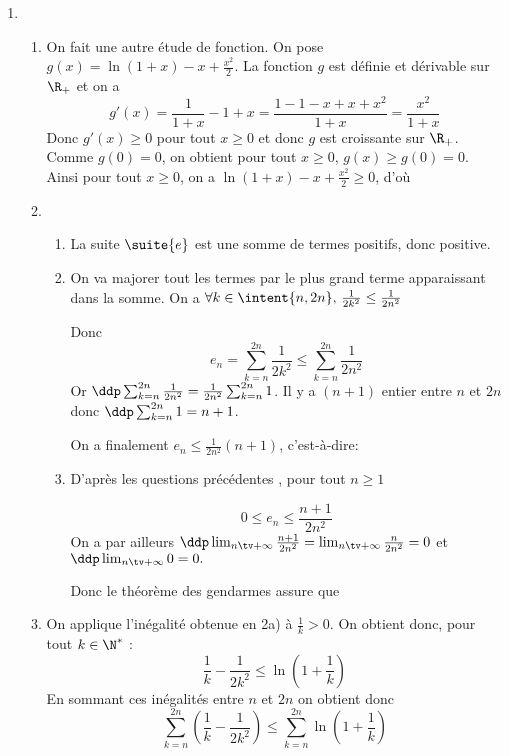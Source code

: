 \documentclass[a4paper, 11pt,reqno]{article}
\begin{document}
\begin{correction}
\begin{enumerate}
\begin{enumerate}
 
\end{enumerate}
\item \begin{enumerate}
\item On fait une autre étude de fonction. On pose 
$g(x) =\ln(1+x) -x+\frac{x^2}{2}$. La fonction $g$ est définie et dérivable sur $\R_+$ et on a 
$$g'(x) = \frac{1}{1+x}-1 +x = \frac{1-1-x+x+x^2}{1+x}= \frac{x^2}{1+x}$$
Donc $g'(x)\geq 0 $ pour tout $x\geq 0$ et donc 
$g$ est croissante sur $\R_+$. Comme $g(0) = 0$, on obtient pour tout $x\geq 0$, $g(x)\geq g(0) =0 $.
Ainsi   pour tout $x\geq 0$, on a $\ln(1+x) -x+\frac{x^2}{2} \geq 0$, d'où

\item 
\begin{enumerate}
\item La suite $\suite{e}$ est une somme de termes positifs, donc positive.
\item On va majorer tout les termes par le plus grand terme apparaissant dans la somme. On a 
$\forall k\in \intent{n,2n} , \, \frac{1}{2k^2} \leq \frac{1}{2n^2}$

Donc $$e_n =\sum_{k=n}^{2n} \frac{1}{2k^2}\leq \sum_{k=n}^{2n}  \frac{1}{2n^2}$$
Or $\ddp \sum_{k=n}^{2n}  \frac{1}{2n^2} = \frac{1}{2n^2} \sum_{k=n}^{2n} 1$. 
Il y a $(n+1)$ entier entre $n $ et $2n$ donc 
$\ddp \sum_{k=n}^{2n} 1 =n+1$.

On a finalement 
$e_n \leq \frac{1}{2n^2} (n+1)$, c'est-à-dire:

\item D'après les questions précédentes , pour tout $n\geq 1$ 

$$0\leq e_n \leq  \frac{n+1}{2n^2}$$
On a par ailleurs $\ddp  \lim_{n\tv +\infty } \frac{n+1}{2n^2} =\lim_{n\tv +\infty} \frac{n}{2n^2} = 0$ et $\ddp \lim_{n\tv +\infty} 0=0.$

Donc le théorème des gendarmes assure que 

\end{enumerate}


\item On applique l'inégalité obtenue en 2a) à $\frac{1}{k}>0$. On obtient donc, pour tout $k\in \N^*$ : 
$$\frac{1}{k}-\frac{1}{2k^2}\leq \ln\left(1+\frac{1}{k} \right)$$
En sommant ces inégalités entre $n$ et $2n$ on obtient donc 
$$\sum_{k=n}^{2n} \left(\frac{1}{k}-\frac{1}{2k^2}\right) \leq \sum_{k=n}^{2n}\ln\left(1+\frac{1}{k} \right)$$


\end{enumerate}
\end{enumerate}
\end{correction}
\end{document}
